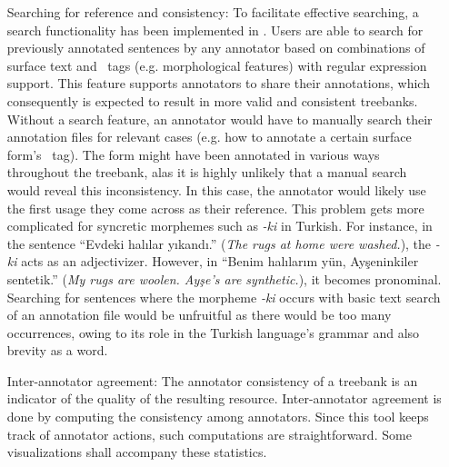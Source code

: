 \begin{itemize}[before=\normalfont, font=\itshape, align=left,noitemsep,topsep=0pt,parsep=3pt,partopsep=0pt,labelsep=3pt,align=left]
    \item[Searching for reference and consistency:]
        To facilitate effective searching, a search functionality has been implemented in \boatvtwo.
        Users are able to search for previously annotated sentences by any annotator based on combinations of surface text and \ud\ tags (e.g. morphological features) with regular expression support.
        This feature supports annotators to share their annotations, which consequently is expected to result in more valid and consistent treebanks.
		Without a search feature, an annotator would have to manually search their annotation files for relevant cases (e.g. how to annotate a certain surface form's \upos\ tag).
		The form might have been annotated in various ways throughout the treebank, alas it is highly unlikely that a manual search would reveal this inconsistency.
		In this case, the annotator would likely use the first usage they come across as their reference.
        This problem gets more complicated for syncretic morphemes such as \textit{-ki} in Turkish.
        For instance, in the sentence ``Evdeki halılar yıkandı.'' (\textit{The rugs at home were washed.}), the \textit{-ki} acts as an adjectivizer.
        However, in ``Benim halılarım yün, Ayşeninkiler sentetik.'' (\textit{My rugs are woolen. Ayşe's are synthetic.}), it becomes pronominal.
        Searching for sentences where the morpheme \textit{-ki} occurs with basic text search of an annotation file would be unfruitful as there would be too many occurrences, owing to its role in the Turkish language's grammar and also brevity as a word.

    \item[Inter-annotator agreement:]
        The annotator consistency of a treebank is an indicator of the quality of the resulting resource.
        Inter-annotator agreement is done by computing the consistency among annotators.
        Since this tool keeps track of annotator actions, such computations are straightforward.
        Some visualizations shall accompany these statistics.

\end{itemize}
